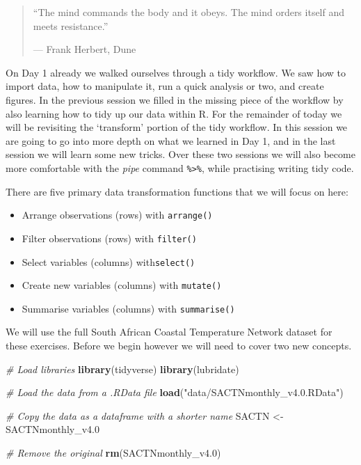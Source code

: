 \documentclass[]{book}
\newenvironment{Shaded}{\begin{snugshade}}{\end{snugshade}}
\newcommand{\KeywordTok}[1]{\textcolor[rgb]{0.13,0.29,0.53}{\textbf{#1}}}
\newcommand{\DecValTok}[1]{\textcolor[rgb]{0.00,0.00,0.81}{#1}}
\newcommand{\StringTok}[1]{\textcolor[rgb]{0.31,0.60,0.02}{#1}}
\newcommand{\CommentTok}[1]{\textcolor[rgb]{0.56,0.35,0.01}{\textit{#1}}}
\newcommand{\NormalTok}[1]{#1}
\providecommand{\tightlist}{%
  \setlength{\itemsep}{0pt}\setlength{\parskip}{0pt}}
\theoremstyle{definition}
\theoremstyle{definition}
\theoremstyle{definition}
\theoremstyle{remark}
\begin{document}
\begin{quote}
``The mind commands the body and it obeys. The mind orders itself and
meets resistance.''

--- Frank Herbert, Dune
\end{quote}

On Day 1 already we walked ourselves through a tidy workflow. We saw how
to import data, how to manipulate it, run a quick analysis or two, and
create figures. In the previous session we filled in the missing piece
of the workflow by also learning how to tidy up our data within R. For
the remainder of today we will be revisiting the `transform' portion of
the tidy workflow. In this session we are going to go into more depth on
what we learned in Day 1, and in the last session we will learn some new
tricks. Over these two sessions we will also become more comfortable
with the \emph{pipe} command \texttt{\%\textgreater{}\%}, while
practising writing tidy code.

There are five primary data transformation functions that we will focus
on here:

\begin{itemize}
\tightlist
\item
  Arrange observations (rows) with \texttt{arrange()}\\
\item
  Filter observations (rows) with \texttt{filter()}\\
\item
  Select variables (columns) with\texttt{select()}\\
\item
  Create new variables (columns) with \texttt{mutate()}\\
\item
  Summarise variables (columns) with \texttt{summarise()}
\end{itemize}

We will use the full South African Coastal Temperature Network dataset
for these exercises. Before we begin however we will need to cover two
new concepts.

\begin{Shaded}
\begin{Highlighting}[]
\CommentTok{# Load libraries}
\KeywordTok{library}\NormalTok{(tidyverse)}
\KeywordTok{library}\NormalTok{(lubridate)}

\CommentTok{# Load the data from a .RData file}
\KeywordTok{load}\NormalTok{(}\StringTok{"data/SACTNmonthly_v4.0.RData"}\NormalTok{)}

\CommentTok{# Copy the data as a dataframe with a shorter name}
\NormalTok{SACTN <-}\StringTok{ }\NormalTok{SACTNmonthly_v4.}\DecValTok{0}

\CommentTok{# Remove the original}
\KeywordTok{rm}\NormalTok{(SACTNmonthly_v4.}\DecValTok{0}\NormalTok{)}
\end{Highlighting}
\end{Shaded}
\end{document}
